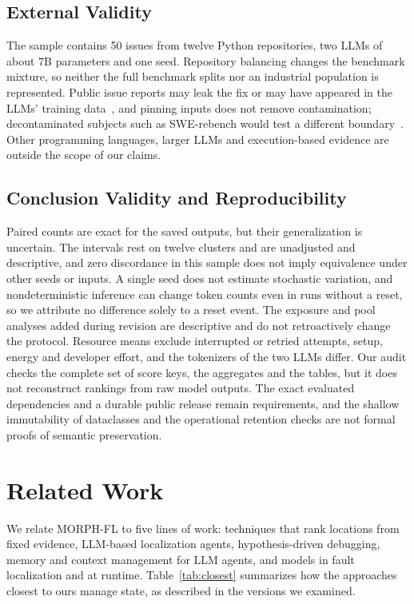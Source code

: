 \documentclass[a4paper,fleqn]{cas-sc}
\newcommand{\tool}{MORPH-FL}
\begin{document}
\subsection{External Validity}
The sample contains 50 issues from twelve Python repositories, two LLMs of about 7B parameters and one seed. Repository balancing changes the benchmark mixture, so neither the full benchmark splits nor an industrial population is represented. Public issue reports may leak the fix or may have appeared in the LLMs' training data~\citep{swebenchillusion2025,swebenchplus2024}, and pinning inputs does not remove contamination; decontaminated subjects such as SWE-rebench would test a different boundary~\citep{swerebench2025}. Other programming languages, larger LLMs and execution-based evidence are outside the scope of our claims.

\subsection{Conclusion Validity and Reproducibility}
Paired counts are exact for the saved outputs, but their generalization is uncertain. The intervals rest on twelve clusters and are unadjusted and descriptive, and zero discordance in this sample does not imply equivalence under other seeds or inputs. A single seed does not estimate stochastic variation, and nondeterministic inference can change token counts even in runs without a reset, so we attribute no difference solely to a reset event. The exposure and pool analyses added during revision are descriptive and do not retroactively change the protocol. Resource means exclude interrupted or retried attempts, setup, energy and developer effort, and the tokenizers of the two LLMs differ. Our audit checks the complete set of score keys, the aggregates and the tables, but it does not reconstruct rankings from raw model outputs. The exact evaluated dependencies and a durable public release remain requirements, and the shallow immutability of dataclasses and the operational retention checks are not formal proofs of semantic preservation.

\section{Related Work}\label{sec:related}
We relate \tool{} to five lines of work: techniques that rank locations from fixed evidence, LLM-based localization agents, hypothesis-driven debugging, memory and context management for LLM agents, and models in fault localization and at runtime. Table~\ref{tab:closest} summarizes how the approaches closest to ours manage state, as described in the versions we examined.
\end{document}
